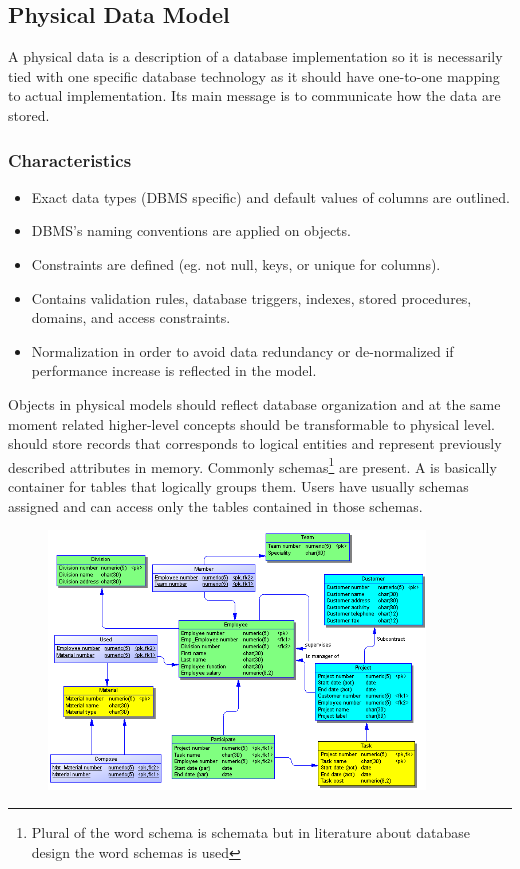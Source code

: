 \subsection{Physical Data Model}

A physical data is a description of a database implementation so it is necessarily tied with one specific database technology as it should have one-to-one mapping to actual implementation. Its main message is to communicate how the data are stored.

\subsubsection{Characteristics}
\begin{itemize}
	\item Exact data types (DBMS specific) and default values of columns are outlined.
	\item DBMS's naming conventions are applied on objects.
	\item Constraints are defined (eg. not null, keys, or unique for columns).
	\item Contains validation rules, database triggers, indexes, stored procedures, domains, and access constraints.
	\item Normalization in order to avoid data redundancy or de-normalized if performance increase is reflected in the model.
\end{itemize}

Objects in physical models should reflect database organization and at the same moment related higher-level concepts should be transformable to physical level.  should store records that corresponds to logical entities and  represent previously described attributes in memory.
Commonly schemas\footnote{Plural of the word schema is schemata but in literature about database design the word schemas is used} are present. A  is basically container for tables that logically groups them. Users have usually schemas assigned and can access only the tables contained in those schemas.

\begin{figure}[h]
	\centering
	\includegraphics[width=10cm]{../img/Physical_Model_PowerDesigner}
	\caption{\cite{PhysicalModelExample}}
\end{figure}


